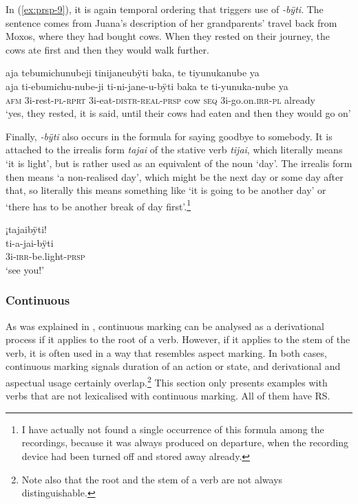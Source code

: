 In (\ref{ex:prsp-9}), it is again temporal ordering that triggers use of \textit{-bÿti}. The sentence comes from Juana’s description of her grandparents’ travel back from Moxos, where they had bought cows. When they rested on their journey, the cows ate first and then they would walk further.

\ea\label{ex:prsp-9}
\begingl
\glpreamble aja tebumichunubeji tinijaneubÿti baka, te tiyunukanube ya\\
\gla aja ti-ebumichu-nube-ji ti-ni-jane-u-bÿti baka te ti-yunuka-nube ya\\
\glb \textsc{afm} 3i-rest-\textsc{pl}-\textsc{rprt} 3i-eat-\textsc{distr}-\textsc{real}-\textsc{prsp} cow \textsc{seq} 3i-go.on.\textsc{irr}-\textsc{pl} already\\
\glft ‘yes, they rested, it is said, until their cows had eaten and then they would go on’
\endgl
\trailingcitation{[jxx-p151016l-2.043-045]}
\xe


Finally, \textit{-bÿti} also occurs in the formula for saying goodbye to somebody. It is attached to the irrealis form \textit{tajai} of the stative verb \textit{tijai}, which literally means ‘it is light’, but is rather used as an equivalent of the noun ‘day’. The irrealis form then means ‘a non-realised day’, which might be the next day or some day after that, so literally this means something like ‘it is going to be another day’ or ‘there has to be another break of day first’.\footnote{I have actually not found a single occurrence of this formula among the recordings, because it was always produced on departure, when the recording device had been turned off and stored away already.}

\ea\label{ex:prsp-10}
\begingl
\glpreamble ¡tajaibÿti!\\
\gla ti-a-jai-bÿti\\
\glb 3i-\textsc{irr}-be.light-\textsc{prsp}\\
\glft ‘see you!’
\endgl
\xe
{}

\subsubsection{Continuous}\label{sec:ContinuousAspect}

As was explained in , continuous marking can be analysed as a derivational process if it applies to the root of a verb. However, if it applies to the stem of the verb, it is often used in a way that resembles aspect marking. In both cases, continuous marking signals duration of an action or state, and derivational and aspectual usage certainly overlap.\footnote{Note also that the root and the stem of a verb are not always distinguishable.} This section only presents examples with verbs that are not lexicalised with continuous marking. All of them have  RS.

